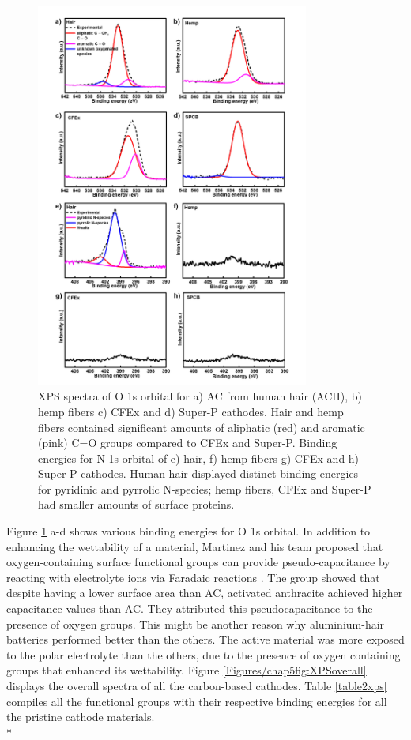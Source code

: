 \begin{figure}[h!]
  \centering
  \includegraphics[width=0.8\textwidth]{Figures/chap5fig/XPSON}
    \caption{XPS spectra of O 1s orbital for a) AC from human hair (ACH), b) hemp fibers c) CFEx and d) Super-P cathodes. Hair and hemp fibers contained significant amounts of aliphatic (red) and aromatic (pink) C=O groups  compared to CFEx and Super-P. Binding energies for N 1s orbital of e) hair, f) hemp fibers g) CFEx and h) Super-P cathodes. Human hair displayed distinct binding energies for pyridinic and pyrrolic N-species; hemp fibers, CFEx and Super-P had smaller amounts of surface proteins.}
  \label{Figures/chap5fig:XPSON}
\end{figure}

Figure \ref{Figures/chap5fig:XPSON} a-d shows various binding energies for O 1s orbital. In addition to enhancing the wettability of a material, Martinez and his team proposed that oxygen-containing surface functional groups can provide pseudo-capacitance by reacting with electrolyte ions  via Faradaic reactions \cite{li_effect_2011, oh_oxygen_2014, bleda-martinez_role_2005}. The group showed that despite having a lower surface area than AC, activated anthracite achieved higher capacitance values than AC. They attributed this pseudocapacitance to the presence of oxygen groups. This might be another reason why aluminium-hair batteries performed better than the others. The active material was more exposed to the polar electrolyte than the others, due to the presence of oxygen containing groups that enhanced its wettability. Figure \ref{Figures/chap5fig:XPSoverall} displays the overall spectra of all the carbon-based cathodes. Table \ref{table2xps} compiles all the functional groups with their respective binding energies for all the pristine cathode materials. \\*

